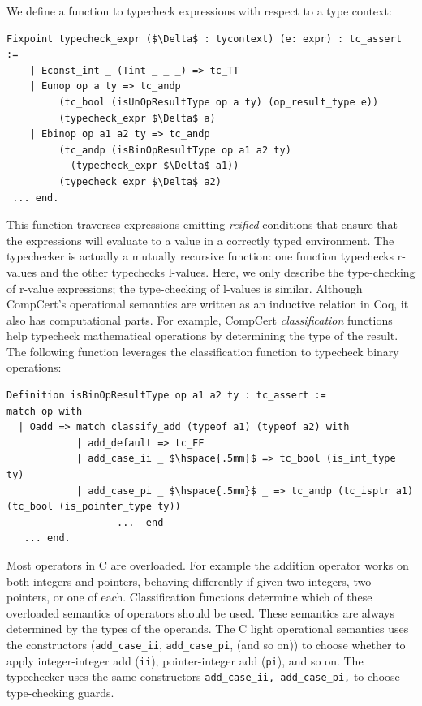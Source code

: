\documentclass{puthesis}
\begin{document}
We define a function to typecheck expressions with respect to a type context:

\begin{lstlisting}
Fixpoint typecheck_expr ($\Delta$ : tycontext) (e: expr) : tc_assert :=
    | Econst_int _ (Tint _ _ _) => tc_TT 
    | Eunop op a ty => tc_andp 
         (tc_bool (isUnOpResultType op a ty) (op_result_type e)) 
         (typecheck_expr $\Delta$ a) 
    | Ebinop op a1 a2 ty => tc_andp 
         (tc_andp (isBinOpResultType op a1 a2 ty)  
           (typecheck_expr $\Delta$ a1)) 
         (typecheck_expr $\Delta$ a2)
 ... end.
\end{lstlisting}

\noindent This function traverses expressions emitting \emph{reified}
conditions that ensure that the expressions will evaluate to a value
in a correctly typed environment. The typechecker is actually a
mutually recursive function: one function typechecks r-values and the
other typechecks l-values.  Here, we only describe the type-checking
of r-value expressions; the type-checking of l-values is similar.
Although CompCert's operational semantics are written as an inductive
relation in Coq, it also has computational parts. For example,
CompCert \emph{classification} functions help typecheck mathematical
operations by determining the type of the result. The following
function leverages the classification function to typecheck binary
operations:

\begin{lstlisting}
Definition isBinOpResultType op a1 a2 ty : tc_assert :=
match op with
  | Oadd => match classify_add (typeof a1) (typeof a2) with 
            | add_default => tc_FF
            | add_case_ii _ $\hspace{.5mm}$ => tc_bool (is_int_type ty) 
            | add_case_pi _ $\hspace{.5mm}$ _ => tc_andp (tc_isptr a1) (tc_bool (is_pointer_type ty)) 
                   ...  end   
   ... end.
\end{lstlisting}

Most operators in C are overloaded. For example the addition operator
works on both integers and pointers, behaving differently if given two
integers, two pointers, or one of each.  Classification functions
determine which of these overloaded semantics of operators should be
used. These semantics are always determined by the types of the
operands.  The C light operational semantics uses the constructors
(\lstinline|add_case_ii|, \lstinline|add_case_pi|, (and so on)) to
choose whether to apply integer-integer add (\lstinline|ii|),
pointer-integer add (\lstinline|pi|), and so on.  The typechecker uses
the same constructors \lstinline{add_case_ii, add_case_pi,} to choose
type-checking guards.
\end{document}
